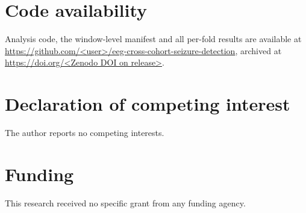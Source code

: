 \documentclass[11pt,a4paper]{article}
\begin{document}
\section*{Code availability}
Analysis code, the window-level manifest and all per-fold results are
available at \url{https://github.com/<user>/eeg-cross-cohort-seizure-detection},
archived at \url{https://doi.org/<Zenodo DOI on release>}.

\section*{Declaration of competing interest}
The author reports no competing interests.

\section*{Funding}
This research received no specific grant from any funding agency.
\end{document}
